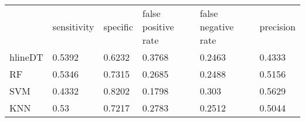 \begin{table}[!h]
\begin{tabular}{l | l | l| l| l | l}
 & sensitivity & specific & false positive rate & false negative rate & precision \\hlineDT & 0.5392 & 0.6232 & 0.3768 & 0.2463 & 0.4333\\
RF & 0.5346 & 0.7315 & 0.2685 & 0.2488 & 0.5156\\
SVM & 0.4332 & 0.8202 & 0.1798 & 0.303 & 0.5629\\
KNN & 0.53 & 0.7217 & 0.2783 & 0.2512 & 0.5044\\
\end{tabular}
\caption{}
\end{table}
